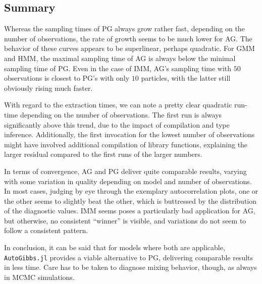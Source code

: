 \FloatBlock
\clearpage

\subsection*{Summary}

Whereas the sampling times of PG always grow rather fast, depending on the number of observations,
the rate of growth seems to be much lower for AG.  The behavior of these curves appears to be
superlinear, perhaps quadratic.  For GMM and HMM, the maximal sampling time of AG is always below
the minimal sampling time of PG.  Even in the case of IMM, AG's sampling time with \(50\)
observations is closest to PG's with only \(10\) particles, with the latter still obviously rising
much faster.

With regard to the extraction times, we can note a pretty clear quadratic run-time depending on the
number of observations.  The first run is always significantly above this trend, due to the impact
of compilation and type inference.  Additionally, the first invocation for the lowest number of
observations might have involved additional compilation of library functions, explaining the larger
residual compared to the first runs of the larger numbers.

In terms of convergence, AG and PG deliver quite comparable results, varying with some variation in
quality depending on model and number of observations.  In most cases, judging by eye through the
exemplary autocorrelation plots, one or the other seems to slightly beat the other, which is
buttressed by the distribution of the diagnostic values.  IMM seems poses a particularly bad
application for AG, but otherwise, no consistent \enquote{winner} is visible, and variations do not
seem to follow a consistent pattern.

In conclusion, it can be said that for models where both are applicable, \texttt{Auto\-Gibbs.jl}
provides a viable alternative to PG, delivering comparable results in less time.  Care has to be
taken to diagnose mixing behavior, though, as always in MCMC simulations.


